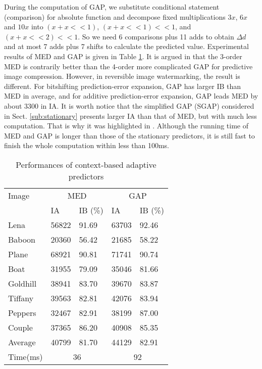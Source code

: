 \documentclass[journal]{IEEEtran}
\begin{document}
During the computation of GAP, we substitute conditional statement (comparison) for absolute
function and decompose fixed multiplications $3x$, $6x$ and $10x$ into $(x+x<<1)$, $(x+x<<1)<<1$, and
$(x+x<<2)<<1$. So we need 6 comparisons plus 11 adds to obtain $\Delta d$ and at most 7 adds plus
7 shifts to calculate the predicted value. Experimental results of MED and GAP is given in Table
\ref{tbl:capper}. It is argued in \cite{Memon97predictors} that the 3-order MED is contrarily better
than the 4-order more complicated GAP for predictive image compression. However, in reversible image
watermarking, the result is different. For bitshifting prediction-error expansion, GAP has larger
IB than MED in average, and for additive prediction-error expansion, GAP leads MED by about 3300 in
IA. It is worth notice that the simplified GAP (SGAP) considered in Sect.  \ref{sub:stationary}
presents larger IA than that of MED, but with much less computation. That is why it was highlighted
in \cite{Chen09add}. Although the running time of MED and GAP is longer than those of the stationary
predictors, it is still fast to finish the whole computation within less than 100ms.

\begin{table}
    \caption{\label{tbl:capper}Performances of context-based adaptive predictors}
    \centering
    \begin{tabular}{lllll}\hline\hline
	Image & \multicolumn{2}{c|}{MED} & \multicolumn{2}{c}{GAP} \\\cline{2-5}
		& IA	&  IB (\%)& IA 	& IB (\%) \\\hline
	Lena 	& 56822 & 91.69 & 63703 & 92.46 \\
	Baboon 	& 20360 & 56.42 & 21685 & 58.22 \\
	Plane	& 68921 & 90.81 & 71741 & 90.74 \\
	Boat	& 31955 & 79.09 & 35046 & 81.66 \\
	Goldhill& 38941 & 83.70 & 39670 & 83.87 \\
	Tiffany	& 39563 & 82.81 & 42076 & 83.94 \\
	Peppers	& 32467 & 82.91 & 38199 & 87.00 \\
	Couple	& 37365 & 86.20 & 40908 & 85.35 \\
	Average	& 40799 & 81.70 & 44129 & 82.91 \\
	Time(ms)& \multicolumn{2}{c}{36} & \multicolumn{2}{c}{92} \\\hline\hline
    \end{tabular}
\end{table}
\end{document}
